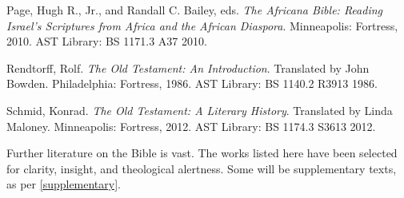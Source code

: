 \documentclass[titlepage]{article}
\begin{document}
\begin{thebibliography}{99}
	 Page, Hugh R., Jr., and Randall C. Bailey, eds.
	\emph{The Africana Bible: Reading Israel’s Scriptures from Africa and the African Diaspora}.
	Minneapolis: Fortress, 2010.
	AST Library: BS 1171.3 A37 2010.

	 Rendtorff, Rolf.
	\emph{The Old Testament: An Introduction}. Translated by John Bowden.
	Philadelphia: Fortress, 1986.
	AST Library: BS 1140.2 R3913 1986.

	 Schmid, Konrad.
	\emph{The Old Testament: A Literary History}. Translated by Linda Maloney.
	Minneapolis: Fortress, 2012.
	AST Library: BS 1174.3 S3613 2012.

\end{thebibliography}
\endgroup


Further literature on the Bible is vast. The works listed here have been
selected for clarity, insight, and theological alertness. Some will be
supplementary texts, as per \autoref{supplementary}.
\end{document}
